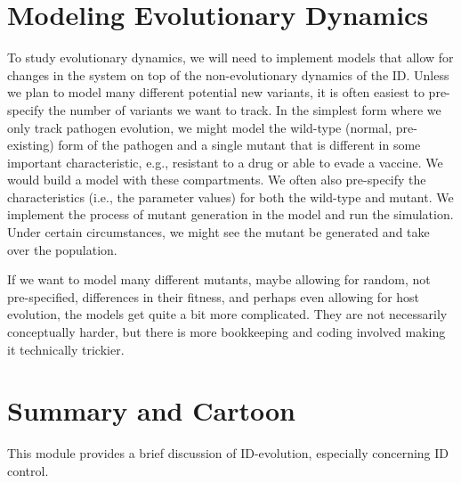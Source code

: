 \documentclass[]{book}
\theoremstyle{definition}
\theoremstyle{definition}
\theoremstyle{definition}
\theoremstyle{remark}
\begin{document}
\section{Modeling Evolutionary
Dynamics}\label{modeling-evolutionary-dynamics}

To study evolutionary dynamics, we will need to implement models that
allow for changes in the system on top of the non-evolutionary dynamics
of the ID. Unless we plan to model many different potential new
variants, it is often easiest to pre-specify the number of variants we
want to track. In the simplest form where we only track pathogen
evolution, we might model the wild-type (normal, pre-existing) form of
the pathogen and a single mutant that is different in some important
characteristic, e.g., resistant to a drug or able to evade a vaccine. We
would build a model with these compartments. We often also pre-specify
the characteristics (i.e., the parameter values) for both the wild-type
and mutant. We implement the process of mutant generation in the model
and run the simulation. Under certain circumstances, we might see the
mutant be generated and take over the population.

If we want to model many different mutants, maybe allowing for random,
not pre-specified, differences in their fitness, and perhaps even
allowing for host evolution, the models get quite a bit more
complicated. They are not necessarily conceptually harder, but there is
more bookkeeping and coding involved making it technically trickier.

\section{Summary and Cartoon}\label{summary-and-cartoon-12}

This module provides a brief discussion of ID-evolution, especially
concerning ID control.
\end{document}

